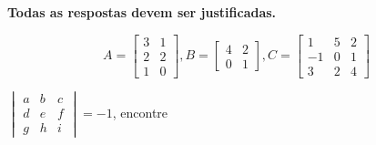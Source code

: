 \documentclass{prova}
\DeclareMathOperator{\tr}{tr}
\begin{document}

    \textbf{Todas as respostas devem ser justificadas.}

    \begin{questionario}
    	\[A = \begin{bmatrix}
    			3 & 1 \\
    			2 & 2 \\
    			1 & 0
    		\end{bmatrix},
    	B = \begin{bmatrix}
    			4 & 2 \\
    			0 & 1
    		\end{bmatrix},
    	C = \begin{bmatrix}
    			1 & 5 & 2 \\
    			-1 & 0 & 1 \\
    			3 & 2 & 4
        \end{bmatrix}\]
            \begin{enumerate*}
                \hspace{0.5cm}
                \hspace{0.5cm}
                \hspace{0.5cm}
                \hspace{0.5cm}
                \hspace{0.5cm}
                \hspace{0.5cm}
                \qq{$\tr(AA^T+C)$}
            \end{enumerate*}
            $\begin{vmatrix}
    			a & b & c \\
    			d & e & f \\
    			g & h & i
    		\end{vmatrix}=-1$,
    		encontre


\end{questionario}
\end{document}
